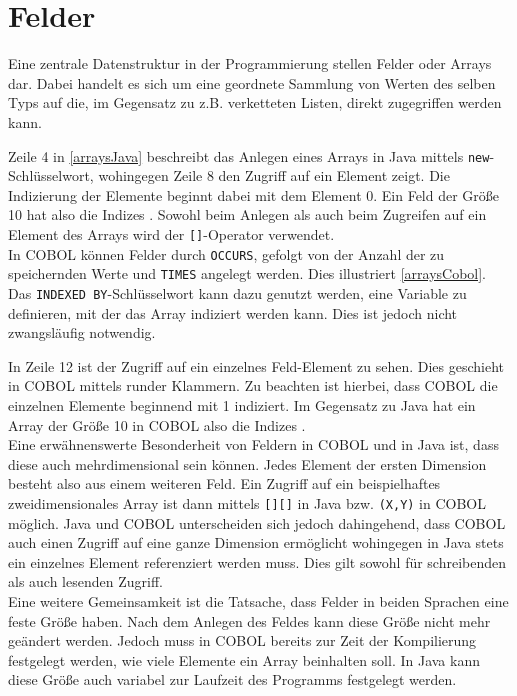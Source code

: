 \section{Felder}\label{sec:felder}
Eine zentrale Datenstruktur in der Programmierung stellen Felder oder Arrays dar. Dabei handelt es sich um eine geordnete Sammlung von Werten des selben Typs auf die, im Gegensatz zu z.B. verketteten Listen, direkt zugegriffen werden kann.\\


Zeile 4 in \autoref{arraysJava} beschreibt das Anlegen eines Arrays in Java mittels \texttt{new}-Schlüsselwort, wohingegen Zeile 8 den Zugriff auf ein Element zeigt. Die Indizierung der Elemente beginnt dabei mit dem Element 0. Ein Feld der Größe 10 hat also die Indizes . Sowohl beim Anlegen als auch beim Zugreifen auf ein Element des Arrays wird der \texttt{[]}-Operator verwendet.\\

In COBOL können Felder durch \texttt{OCCURS}, gefolgt von der Anzahl der zu speichernden Werte und \texttt{TIMES} angelegt werden. Dies illustriert \autoref{arraysCobol}. Das \texttt{INDEXED BY}-Schlüsselwort kann dazu genutzt werden, eine Variable zu definieren, mit der das Array indiziert werden kann. Dies ist jedoch nicht zwangsläufig notwendig.\\


In Zeile 12 ist der Zugriff auf ein einzelnes Feld-Element zu sehen. Dies geschieht in COBOL mittels runder Klammern. Zu beachten ist hierbei, dass COBOL die einzelnen Elemente beginnend mit 1 indiziert. Im Gegensatz zu Java hat ein Array der Größe 10 in COBOL also die Indizes .\\

Eine erwähnenswerte Besonderheit von Feldern in COBOL und in Java ist, dass diese auch mehrdimensional sein können. Jedes Element der ersten Dimension besteht also aus einem weiteren Feld. Ein Zugriff auf ein beispielhaftes zweidimensionales Array ist dann mittels \texttt{[][]} in Java bzw. \texttt{(X,Y)} in COBOL möglich. Java und COBOL unterscheiden sich jedoch dahingehend, dass COBOL auch einen Zugriff auf eine ganze Dimension ermöglicht wohingegen in Java stets ein einzelnes Element referenziert werden muss. Dies gilt sowohl für schreibenden als auch lesenden Zugriff.\\

Eine weitere Gemeinsamkeit ist die Tatsache, dass Felder in beiden Sprachen eine feste Größe haben. Nach dem Anlegen des Feldes kann diese Größe nicht mehr geändert werden. Jedoch muss in COBOL bereits zur Zeit der Kompilierung festgelegt werden, wie viele Elemente ein Array beinhalten soll. In Java kann diese Größe auch variabel zur Laufzeit des Programms festgelegt werden.\\